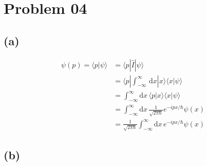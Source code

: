 \documentclass[letterpaper]{article}
\newcommand{\hb}{\hbar}
\begin{document}
\section*{Problem 04} 
\subsection*{(a)}
\begin{align*}
	\psi(p) = \langle p | \psi \rangle &= \langle p | \hat{I} | \psi \rangle  \\
	&= \langle p | \int_{-\infty}^{\infty} \, \mathrm{d} x | x \rangle \langle x | \psi \rangle  \\
	&= \int_{-\infty}^{\infty}\mathrm{d} x\, \langle p | x \rangle \langle x | \psi\rangle  \\
	&= \int_{-\infty}^{\infty}  \mathrm{d} x\, \frac{1}{\sqrt{2 \pi \hb}  } e^{-i p x / \hb} \psi(x) \\
	&=  \frac{1}{\sqrt{2 \pi \hb} } \int_{-\infty}^{\infty}  \mathrm{d} x\, e^{-i p x / \hb} \psi(x) 
\end{align*}


\subsection*{(b)}
\end{document}
